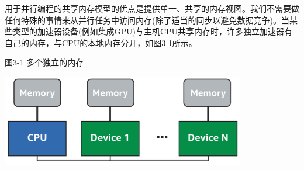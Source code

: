 用于并行编程的共享内存模型的优点是提供单一、共享的内存视图。我们不需要做任何特殊的事情来从并行任务中访问内存(除了适当的同步以避免数据竞争)。当某些类型的加速器设备(例如集成GPU)与主机CPU共享内存时，许多独立加速器有自己的内存，与CPU的本地内存分开，如图3-1所示。\par

\hspace*{\fill} \par %
图3-1 多个独立的内存
\begin{center}
	\includegraphics[width=0.8\textwidth]{content/chapter-3/images/2}
\end{center}









